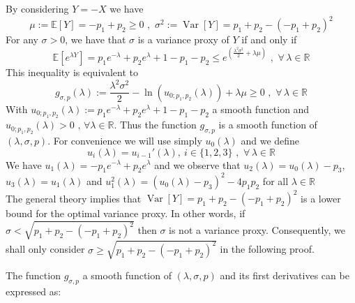 \documentclass[a4paper, 10pt]{article}
\newcommand{\E}{\mathbb{E}}
\newcommand{\beq}{\begin{equation}}
\newcommand{\eeq}{\end{equation}}
\theoremstyle{definition}
\begin{document}
By considering $Y=-X$ we have
\beq \mu:=\E[Y]=-p_1+p_2 \geq 0\,\,,\,\, \sigma^2:=\operatorname{Var}[Y]=p_1+p_2-(-p_1+p_2)^2\eeq
For any $\sigma>0$, we have that $\sigma$ is a variance proxy of $Y$ if and only if
\beq \E\left[e^{\lambda Y}\right]=p_1 e^{-\lambda }+ p_2e^{\lambda } +1-p_1-p_2\leq e^{(\frac{\lambda^2\sigma^2}{2}+\lambda \mu)} \,\, ,\,\, \forall \, \lambda\in \mathbb{R}\eeq
This inequality is equivalent to
\beq g_{\sigma,p}(\lambda):=\frac{\lambda^2\sigma^2}{2}-\ln(u_{0;p_1, p_2}(\lambda))+\lambda \mu \geq 0 \,\,,\,\,  \forall \, \lambda\in \mathbb{R}\eeq
With  $u_{0;p_1, p_2}(\lambda) := p_1e^{-\lambda}+p_2e^{\lambda}+1-p_1-p_2$ a smooth function and  $u_{0;p_1, p_2}(\lambda) > 0 \text{ , } \forall \lambda \in \mathbb{R}$. Thus the function $g_{\sigma,p}$ is a smooth function of $(\lambda,\sigma,p)$. For convenience we will use simply $u_0(\lambda)$ and we define
\beq u_{i}(\lambda)=u_{i-1}'(\lambda),   \  i  \in \{1,2,3\} \,\,,\,\,  \forall \, \lambda\in \mathbb{R}\eeq
We have $u_1(\lambda) = - p_1e^{-\lambda} + p_2e^{\lambda}$ and we observe that $u_2(\lambda) = u_0(\lambda)-p_3$, $u_3(\lambda) = u_1(\lambda)$ and $u_1^2(\lambda)=(u_0(\lambda)-p_3)^2-4p_1p_2$ for all $\lambda \in \mathbb{R}$ \\
The general theory implies that $\operatorname{Var}[Y]=p_1+p_2-(-p_1+p_2)^2$ is a lower bound for the optimal variance proxy. In other words, if $\sigma<\sqrt{p_1+p_2-(-p_1+p_2)^2}$ then $\sigma$ is not a variance proxy. Consequently, we shall only consider $\sigma \geq\sqrt{p_1+p_2-(-p_1+p_2)^2}$ in the following proof.

The function $g_{\sigma,p}$ a smooth function of $(\lambda,\sigma,p)$ and its first derivatives can be expressed as:
\end{document}
